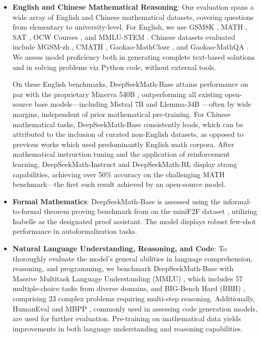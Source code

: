 \begin{itemize}[topsep=0pt]
    \item \textbf{English and Chinese Mathematical Reasoning}: Our evaluation spans a wide array of English and Chinese mathematical datasets, covering questions from elementary to university-level. For English, we use GSM8K \citep{gsm8k}, MATH \citep{MATH}, SAT \citep{llemma}, OCW Courses \citep{minerva}, and MMLU-STEM \citep{mmlu}. Chinese datasets evaluated include MGSM-zh \citep{mgsm}, CMATH \citep{wei2023cmath}, Gaokao-MathCloze \citep{agieval}, and Gaokao-MathQA \citep{agieval}. We assess model proficiency both in generating complete text-based solutions and in solving problems via Python code, without external tools.

    On these English benchmarks, DeepSeekMath-Base attains performance on par with the proprietary Minerva 540B \citep{minerva}, outperforming all existing open-source base models—including Mistral 7B \citep{mistral} and Llemma-34B \citep{llemma}—often by wide margins, independent of prior mathematical pre-training. For Chinese mathematical tasks, DeepSeekMath-Base consistently leads, which can be attributed to the inclusion of curated non-English datasets, as opposed to previous works \citep{minerva,llemma} which used predominantly English math corpora. After mathematical instruction tuning and the application of reinforcement learning, DeepSeekMath-Instruct and DeepSeekMath-RL display strong capabilities, achieving over 50\% accuracy on the challenging MATH benchmark—the first such result achieved by an open-source model.

\item \textbf{Formal Mathematics}: DeepSeekMath-Base is assessed using the informal-to-formal theorem proving benchmark from \citep{dsp_proof} on the miniF2F dataset \citep{minif2f}, utilizing Isabelle \citep{isabelle} as the designated proof assistant. The model displays robust few-shot performance in autoformalization tasks.

\item \textbf{Natural Language Understanding, Reasoning, and Code}: To thoroughly evaluate the model’s general abilities in language comprehension, reasoning, and programming, we benchmark DeepSeekMath-Base with Massive Multitask Language Understanding (MMLU) \citep{mmlu}, which includes 57 multiple-choice tasks from diverse domains, and BIG-Bench Hard (BBH) \citep{bbh}, comprising 23 complex problems requiring multi-step reasoning. Additionally, HumanEval \citep{codex} and MBPP \citep{mbpp}, commonly used in assessing code generation models, are used for further evaluation. Pre-training on mathematical data yields improvements in both language understanding and reasoning capabilities.


\end{itemize}
